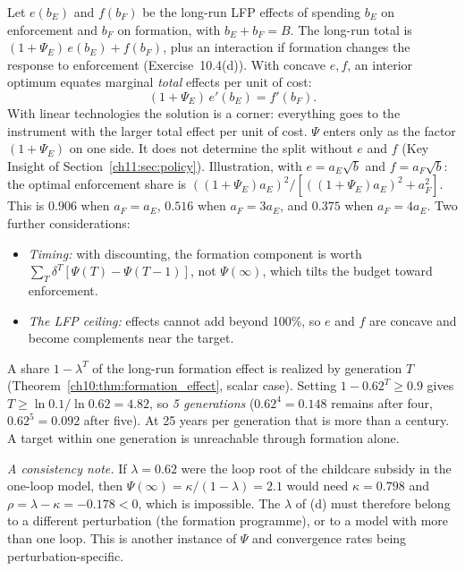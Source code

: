 \documentclass[../solutions_manual.tex]{subfiles}
\begin{document}
 Let $e(b_E)$ and $f(b_F)$ be the long-run LFP effects of spending $b_E$ on enforcement and $b_F$ on formation, with $b_E + b_F = B$. The long-run total is $(1+\Psi_E)\,e(b_E) + f(b_F)$, plus an interaction if formation changes the response to enforcement (Exercise~10.4(d)). With concave $e, f$, an interior optimum equates marginal \emph{total} effects per unit of cost:
\[
(1+\Psi_E)\,e'(b_E) = f'(b_F) .
\]
With linear technologies the solution is a corner: everything goes to the instrument with the larger total effect per unit of cost. $\Psi$ enters only as the factor $(1+\Psi_E)$ on one side. It does not determine the split without $e$ and $f$ (Key Insight of Section~\ref{ch11:sec:policy}). Illustration, with $e = a_E\sqrt{b}$ and $f = a_F\sqrt{b}$: the optimal enforcement share is $((1+\Psi_E)a_E)^2/[((1+\Psi_E)a_E)^2 + a_F^2]$. This is $0.906$ when $a_F = a_E$, $0.516$ when $a_F = 3a_E$, and $0.375$ when $a_F = 4a_E$. Two further considerations:
\begin{itemize}
\item \emph{Timing:} with discounting, the formation component is worth $\sum_T \delta^T[\Psi(T) - \Psi(T-1)]$, not $\Psi(\infty)$, which tilts the budget toward enforcement.
\item \emph{The LFP ceiling:} effects cannot add beyond 100\%, so $e$ and $f$ are concave and become complements near the target.
\end{itemize}

 A share $1 - \lambda^T$ of the long-run formation effect is realized by generation $T$ (Theorem~\ref{ch10:thm:formation_effect}, scalar case). Setting $1 - 0.62^T \ge 0.9$ gives $T \ge \ln 0.1/\ln 0.62 = 4.82$, so \emph{5 generations} ($0.62^4 = 0.148$ remains after four, $0.62^5 = 0.092$ after five). At 25 years per generation that is more than a century. A target within one generation is unreachable through formation alone.

\textit{A consistency note.} If $\lambda = 0.62$ were the loop root of the childcare subsidy in the one-loop model, then $\Psi(\infty) = \kappa/(1-\lambda) = 2.1$ would need $\kappa = 0.798$ and $\rho = \lambda - \kappa = -0.178 < 0$, which is impossible. The $\lambda$ of (d) must therefore belong to a different perturbation (the formation programme), or to a model with more than one loop. This is another instance of $\Psi$ and convergence rates being perturbation-specific.

\fussy
\end{document}
